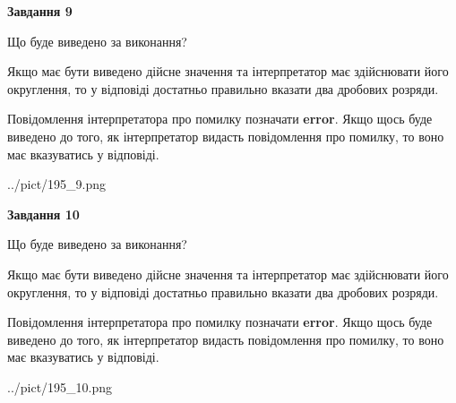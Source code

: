 \documentclass[12pt, ukrainian]{article}
\begin{document}
{\begin {Large}
{\begin {center}\textbf{Завдання 9}\end {center}}\par
Що буде виведено за виконання? \par

Якщо має бути виведено дійсне значення та інтерпретатор має здійснювати його округлення, 
то у відповіді достатньо правильно вказати два дробових розряди.

Повідомлення інтерпретатора про помилку позначати \textbf{error}.
Якщо щось буде виведено до того, як інтерпретатор видасть повідомлення про помилку, 
то воно має вказуватись у відповіді. \par

\begin{center}
	{../pict/195_9.png}
\end{center}
\newpage

{\begin {center}\textbf{Завдання 10}\end {center}}\par
Що буде виведено за виконання? \par

Якщо має бути виведено дійсне значення та інтерпретатор має здійснювати його округлення, 
то у відповіді достатньо правильно вказати два дробових розряди.

Повідомлення інтерпретатора про помилку позначати \textbf{error}.
Якщо щось буде виведено до того, як інтерпретатор видасть повідомлення про помилку, 
то воно має вказуватись у відповіді. \par

\begin{center}
	{../pict/195_10.png}
\end{center}
\newpage

\end {Large}}
\end{document}
